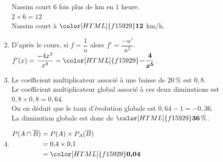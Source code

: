 \documentclass[a4paper,11pt,landscape,exos]{nsi} %
\begin{document}
\begin{multicols}{2}
\begin{enumerate}[itemsep=.75em]
    Nassim court $6$ fois plus de km en $1$ heure.\\
   $2\times 6=12$\\
   Nassim court à ${\color[HTML]{f15929}\boldsymbol{12}}$ km/h.
\item D'après le cours, si $f=\dfrac{1}{u}$ alors $f'=\dfrac{-u'}{u^2}$.\\
    $f'(x)=\dfrac{-4x^{3}}{x^{8}}={\color[HTML]{f15929}\boldsymbol{-\dfrac{4}{x^{5}}}}$.
\item  Le coefficient multiplicateur  associé à une baisse de $20\,\%$ est $0{,}8$.\\
    Le coefficient multiplicateur global associé à ces deux diminutions est $0{,}8\times 0{,}8= 0{,}64$.\\
    On en déduit que le taux d'évolution globale est $0{,}64-1=-0{,}36$.\\
    La diminution globale est donc de ${\color[HTML]{f15929}\boldsymbol{36}} \,\%$.
\item $\begin{aligned}
            P(A\cap\overline{B}) & =P(A)\times P_A(\overline{B})\\
            &=0{,}4\times 0{,}1\\
              &={\color[HTML]{f15929}\boldsymbol{0{,}04}}
              \end{aligned}$
\end{enumerate}
\end{multicols}
\end{document}
